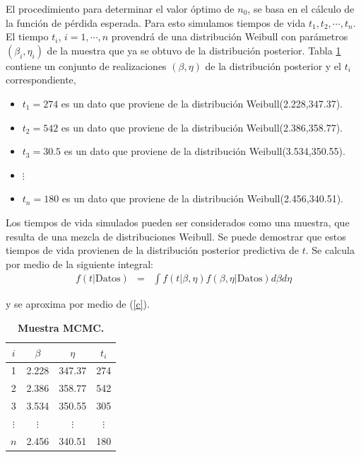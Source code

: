 \noindent El procedimiento  para determinar el valor \'optimo de $n_0$, se basa en el c\'alculo de la funci\'on de p\'erdida esperada. Para esto simulamos tiempos de vida $t_1,t_2,\cdots, t_n$. El tiempo $t_i$, $i=1,\cdots,n$ provendr\'a de una distribuci\'on Weibull con par\'ametros $(\beta_i,\eta_i)$ de la muestra que ya se obtuvo de la distribuci\'on posterior. Tabla \ref{ejee} contiene un conjunto de realizaciones $(\beta,\eta)$ de la distribuci\'on posterior y el $t_i$ correspondiente,

\begin{itemize}
\item $t_1=274$ es un dato que proviene de la distribuci\'on Weibull(2.228,347.37).
\item $t_2=542$ es un dato que proviene de la distribuci\'on Weibull(2.386,358.77).
\item $t_3=30.5$ es un dato que proviene de la distribuci\'on Weibull(3.534,350.55).
\item $\vdots$
\item $t_n=180$ es un dato que proviene de la distribuci\'on Weibull(2.456,340.51).
\end{itemize}
\noindent Los tiempos de vida simulados pueden ser considerados como una muestra, que resulta de una mezcla de distribuciones Weibull. Se puede demostrar que estos tiempos de vida provienen de la distribuci\'on posterior predictiva de $t$. Se calcula por medio de la siguiente integral:
\begin{eqnarray*}
f(t|\mbox{Datos})&=& \int f(t|\beta,\eta)f(\beta,\eta|\mbox{Datos})d\beta d\eta
\end{eqnarray*}

y se aproxima por medio de (\ref{c}).



\begin{table}
\begin{center}

\vspace{-.3 cm}\caption{\bf Muestra MCMC.}\label{ejee}
\vspace{0.3cm}\begin{tabular}{cccc}
\toprule[0.6mm]
$i$&$\beta$ &$\eta$& $t_i$\\\toprule[0.6mm]
1&2.228 & 347.37 & 274
\\ 2&2.386 & 358.77 & 542
\\3&3.534 & 350.55 &305\\
 $\vdots$&$\vdots$ & $\vdots$ &$\vdots$
\\$n$& 2.456 & 340.51 & 180\\
\toprule[0.6mm]
\end{tabular}
\end{center}

\end{table}
\newpage

